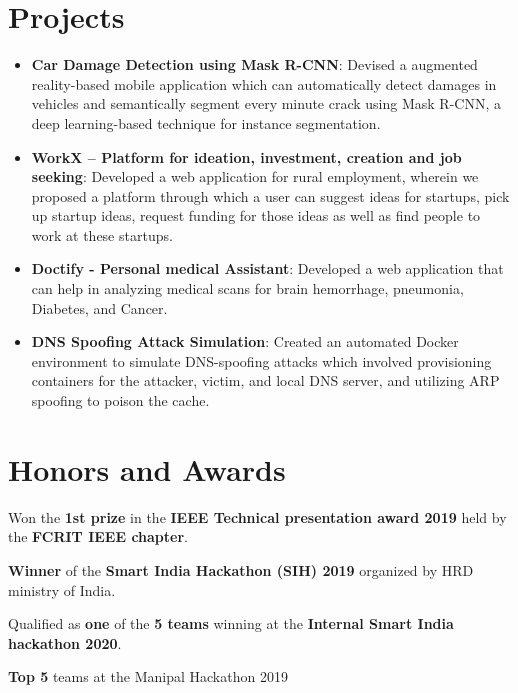 \documentclass[a4paper,20pt]{article}
\newcommand{\resumeItem}[2]{
  \item\small{
    \textbf{#1}{: #2 \vspace{-2pt}}
  }
}
\newcommand{\resumeSubItem}[2]{\resumeItem{#1}{#2}\vspace{-3pt}}
\newcommand{\resumeSubHeadingListStart}{\begin{itemize}[leftmargin=*]}
\newcommand{\resumeSubHeadingListEnd}{\end{itemize}}
\begin{document}
\section{Projects}
\resumeSubHeadingListStart
\resumeSubItem{Car Damage Detection using Mask R-CNN}{Devised a augmented reality-based mobile application which can automatically detect damages in vehicles and semantically segment every minute crack using Mask R-CNN, a deep learning-based technique for instance segmentation.}
\vspace{2pt}
\resumeSubItem{WorkX – Platform for ideation, investment, creation and job seeking}{Developed a web application for rural employment, wherein we proposed a platform through which a user can suggest ideas for startups, pick up startup ideas, request funding for those ideas as well as find people to work at these startups.}
\vspace{2pt}
\resumeSubItem{Doctify - Personal medical Assistant}{Developed a web application that can help in analyzing medical scans for brain hemorrhage, pneumonia, Diabetes, and Cancer.}
\vspace{2pt}
\resumeSubItem{DNS Spoofing Attack Simulation}{Created an automated Docker environment to simulate DNS-spoofing attacks which involved provisioning containers for the attacker, victim, and local DNS server, and utilizing ARP spoofing to poison the cache.}
\vspace{6pt}
\resumeSubHeadingListEnd
\vspace{-5pt}

\section{Honors and Awards}
\begin{description}[font=$\bullet$]
\item {Won the \textbf{1st prize} in the \textbf{IEEE Technical presentation award 2019} held by the \textbf{FCRIT IEEE chapter}.}
\vspace{-5pt}
\item {\textbf{Winner} of the \textbf{Smart India Hackathon (SIH) 2019} organized by HRD ministry of India.}
\vspace{-5pt}
\item {Qualified as \textbf{one} of the \textbf{5 teams} winning at the \textbf{Internal Smart India hackathon 2020}.}
\vspace{-5pt}
\item{\textbf{Top 5} teams at the Manipal Hackathon 2019}


\end{description}
\end{document}
